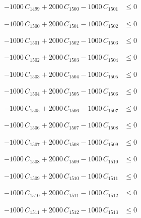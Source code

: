 \documentclass[a4paper,11pt]{article}
\begin{document}
\begin{align}
-1000\,C_{1499} + 2000\,C_{1500} - 1000\,C_{1501} &\leq 0 \nonumber
\end{align}

\begin{align}
-1000\,C_{1500} + 2000\,C_{1501} - 1000\,C_{1502} &\leq 0 \nonumber
\end{align}

\begin{align}
-1000\,C_{1501} + 2000\,C_{1502} - 1000\,C_{1503} &\leq 0 \nonumber
\end{align}

\begin{align}
-1000\,C_{1502} + 2000\,C_{1503} - 1000\,C_{1504} &\leq 0 \nonumber
\end{align}

\begin{align}
-1000\,C_{1503} + 2000\,C_{1504} - 1000\,C_{1505} &\leq 0 \nonumber
\end{align}

\begin{align}
-1000\,C_{1504} + 2000\,C_{1505} - 1000\,C_{1506} &\leq 0 \nonumber
\end{align}

\begin{align}
-1000\,C_{1505} + 2000\,C_{1506} - 1000\,C_{1507} &\leq 0 \nonumber
\end{align}

\begin{align}
-1000\,C_{1506} + 2000\,C_{1507} - 1000\,C_{1508} &\leq 0 \nonumber
\end{align}

\begin{align}
-1000\,C_{1507} + 2000\,C_{1508} - 1000\,C_{1509} &\leq 0 \nonumber
\end{align}

\begin{align}
-1000\,C_{1508} + 2000\,C_{1509} - 1000\,C_{1510} &\leq 0 \nonumber
\end{align}

\begin{align}
-1000\,C_{1509} + 2000\,C_{1510} - 1000\,C_{1511} &\leq 0 \nonumber
\end{align}

\begin{align}
-1000\,C_{1510} + 2000\,C_{1511} - 1000\,C_{1512} &\leq 0 \nonumber
\end{align}

\begin{align}
-1000\,C_{1511} + 2000\,C_{1512} - 1000\,C_{1513} &\leq 0 \nonumber
\end{align}
\end{document}
